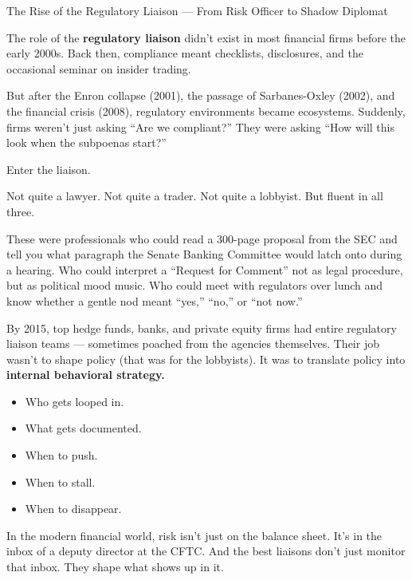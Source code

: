 \begin{HistoricalSidebar}{The Rise of the Regulatory Liaison --- From Risk Officer to Shadow Diplomat}

The role of the \textbf{regulatory liaison} didn’t exist in most financial firms before the early 2000s.
Back then, compliance meant checklists, disclosures, and the occasional seminar on insider trading.

\medskip

But after the Enron collapse (2001), the passage of Sarbanes-Oxley (2002), and the financial crisis (2008), 
regulatory environments became ecosystems.
Suddenly, firms weren’t just asking “Are we compliant?”
They were asking “How will this look when the subpoenas start?”

\medskip

Enter the liaison.

\medskip

Not quite a lawyer.
Not quite a trader.
Not quite a lobbyist.
But fluent in all three.

\medskip

These were professionals who could read a 300-page proposal from the SEC and tell you what paragraph the Senate 
Banking Committee would latch onto during a hearing.
Who could interpret a “Request for Comment” not as legal procedure, but as political mood music.
Who could meet with regulators over lunch and know whether a gentle nod meant “yes,” “no,” or “not now.”

\medskip

By 2015, top hedge funds, banks, and private equity firms had entire regulatory liaison teams — sometimes poached 
from the agencies themselves.
Their job wasn’t to shape policy (that was for the lobbyists).
It was to translate policy into \textbf{internal behavioral strategy.}

\medskip

\begin{itemize}
  \item Who gets looped in.
  \item What gets documented.
  \item When to push.
  \item When to stall.
  \item When to disappear.
\end{itemize}

\medskip

In the modern financial world, risk isn’t just on the balance sheet. It’s in the inbox of a deputy director at the CFTC.
And the best liaisons don’t just monitor that inbox.
They shape what shows up in it.

\end{HistoricalSidebar}

